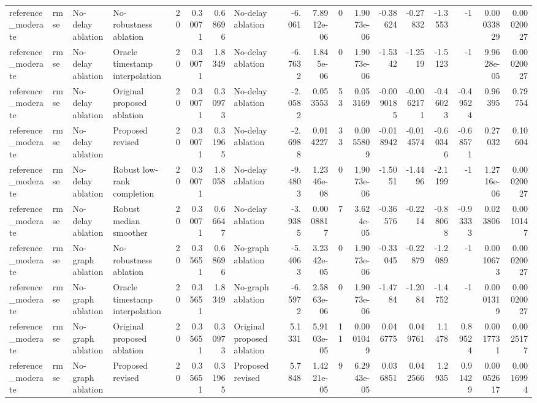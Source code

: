 \begin{table}[!htbp]
{\begin{tabular}{llllrrrlrrrrrrrrrr}
reference_moderate & rmse & No-delay ablation & No-robustness ablation & 20 & 0.30071 & 0.68696 & No-delay ablation & -6.061 & 7.8912e-06 & 0 & 1.9073e-06 & -0.38624 & -0.27832 & -1.3553 & -1 & 0.00033829 & 0.00020027 \\
reference_moderate & rmse & No-delay ablation & Oracle timestamp interpolation & 20 & 0.30071 & 1.8349 & No-delay ablation & -6.7632 & 1.845e-06 & 0 & 1.9073e-06 & -1.5342 & -1.2519 & -1.5123 & -1 & 9.9628e-05 & 0.00020027 \\
reference_moderate & rmse & No-delay ablation & Original proposed ablation & 20 & 0.30071 & 0.30973 & No-delay ablation & -2.0582 & 0.053553 & 53 & 0.053169 & -0.0090185 & -0.0062171 & -0.46023 & -0.49524 & 0.96395 & 0.79754 \\
reference_moderate & rmse & No-delay ablation & Proposed revised & 20 & 0.30071 & 0.31965 & No-delay ablation & -2.6988 & 0.014227 & 33 & 0.0055809 & -0.018942 & -0.014574 & -0.60346 & -0.68571 & 0.27032 & 0.10604 \\
reference_moderate & rmse & No-delay ablation & Robust low-rank completion & 20 & 0.30071 & 1.8058 & No-delay ablation & -9.4803 & 1.2346e-08 & 0 & 1.9073e-06 & -1.5051 & -1.4496 & -2.1199 & -1 & 1.2716e-06 & 0.00020027 \\
reference_moderate & rmse & No-delay ablation & Robust median smoother & 20 & 0.30071 & 0.66647 & No-delay ablation & -3.9385 & 0.0008817 & 7 & 3.624e-05 & -0.36576 & -0.2214 & -0.88068 & -0.93333 & 0.023806 & 0.0010147 \\
reference_moderate & rmse & No-graph ablation & No-robustness ablation & 20 & 0.35651 & 0.68696 & No-graph ablation & -5.4063 & 3.2342e-05 & 0 & 1.9073e-06 & -0.33045 & -0.22879 & -1.2089 & -1 & 0.0010673 & 0.00020027 \\
reference_moderate & rmse & No-graph ablation & Oracle timestamp interpolation & 20 & 0.35651 & 1.8349 & No-graph ablation & -6.5972 & 2.5863e-06 & 0 & 1.9073e-06 & -1.4784 & -1.2084 & -1.4752 & -1 & 0.0001319 & 0.00020027 \\
reference_moderate & rmse & No-graph ablation & Original proposed ablation & 20 & 0.35651 & 0.30973 & Original proposed ablation & 5.1331 & 5.9103e-05 & 11 & 0.0001049 & 0.046775 & 0.049761 & 1.1478 & 0.89524 & 0.0017731 & 0.0025177 \\
reference_moderate & rmse & No-graph ablation & Proposed revised & 20 & 0.35651 & 0.31965 & Proposed revised & 5.7848 & 1.4221e-05 & 9 & 6.2943e-05 & 0.036851 & 0.042566 & 1.2935 & 0.91429 & 0.00052617 & 0.0016994 \\

\end{tabular}}
\end{table}
